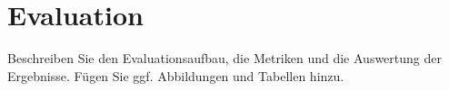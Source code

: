\section{Evaluation}

Beschreiben Sie den Evaluationsaufbau, die Metriken und die Auswertung der
Ergebnisse. Fügen Sie ggf. Abbildungen und Tabellen hinzu.


